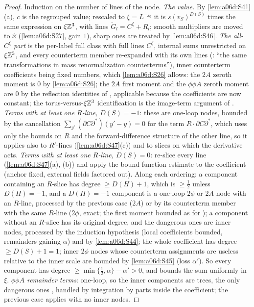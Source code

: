 \begin{proof}
Induction on the number of lines of the node. \emph{The value.} By \cref{lem:a06d:S41}(a), $c$ is the regrouped value; rescaled to $\xi=L^{-j_0}$ it is $s(v_S)^{D(S)}$ times the same expression on $\xi\mathbb Z^3$, with lines $\breve G_l=C^\xi+R_l$; smooth multipliers are moved to $\hat x$ (\cref{lem:a06d:S27}, gain $1$), sharp ones are treated by \cref{lem:a06d:S46}. \emph{The all-$C^\xi$ part} is the per-label full class with full lines $C^\xi$, internal sums unrestricted on $\xi\mathbb Z^3$, and every counterterm member re-expanded with its own lines (\cite[p.~445]{Ba3}: ``the same transformations in mass renormalization counterterms''), inner counterterm coefficients being fixed numbers, which \cref{lem:a06d:S26} allows: the $2A$ zeroth moment is $0$ by \cref{lem:a06d:S26}; the $2A$ first moment and the $\phi\phi A$ zeroth moment are $0$ by the reflection identities of \cite[(3.30)]{Ba3}, applicable because the coefficients are now constant; the torus-versus-$\xi\mathbb Z^3$ identification is the image-term argument of \cite[pp.~418--419]{Ba3}. \emph{Terms with at least one $R$-line, $D(S)=-1$}: these are one-loop nodes, bounded by the cancellation $\sum_{y'}(\partial C\partial^*)(y'-y)=0$ for the term $R\cdot\partial C\partial^*$, which uses only the bounds on $R$ and the forward-difference structure of the other line, so it applies also to $R'$-lines (\cref{lem:a06d:S47}(c)) and to slices on which the derivative acts. \emph{Terms with at least one $R$-line, $D(S)=0$}: re-slice every line (\cref{lem:a06d:S47}(a), (b)) and apply the bound function estimate \cite[(2.16)]{Ba3} to the coefficient (anchor fixed, external fields factored out). Along each ordering: a component containing an $R$-slice has degree $\ge D(H)+1$, which is $\ge\frac12$ unless $D(H)=-1$, and a $D(H)=-1$ component is a one-loop $2\phi$ or $2A$ node with an $R$-line, processed by the previous case ($2A$) or by its counterterm member with the same $R$-line ($2\phi$, exact; the first moment bounded as for \cite[(3.11)]{Ba3}); a component without an $R$-slice has its original degree, and the dangerous ones are inner nodes, processed by the induction hypothesis (local coefficients bounded, remainders gaining $\alpha$) and by \cref{lem:a06d:S44}; the whole coefficient has degree $\ge D(S)+1=1$; inner $2\phi$ nodes whose counterterm assignments are useless relative to the inner scale are bounded by \cref{lem:a06d:S45} (loss $\alpha'$). So every component has degree $\ge\min\{\frac12,\alpha\}-\alpha'>0$, and \cite[(2.16)]{Ba3} bounds the sum uniformly in $\xi$. \emph{$\phi\phi A$ remainder terms}: one-loop, so the inner components are trees, the only dangerous ones \cite[(2.4)]{Ba3}, handled by integration by parts inside the coefficient; the previous case applies with no inner nodes.
\end{proof}

